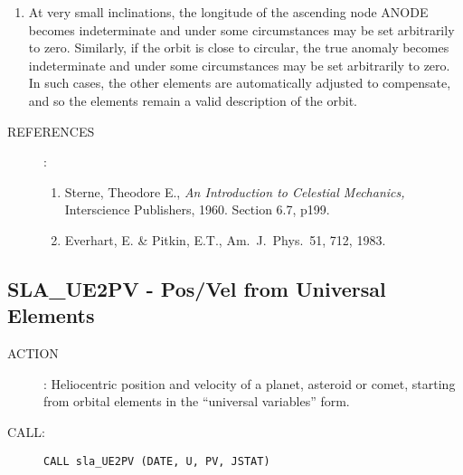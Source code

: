 \documentclass[11pt,twoside]{article}
\newcommand{\xlabel}[1]{}
\newcommand{\routine}[3]
{\hbadness=10000
  \vbox
  {
    \rule{\textwidth}{0.3mm}\\
    {\Large {\bf #1} \hfill #2 \hfill {\bf #1}}\\
    \setlength{\oldspacing}{\topsep}
    \setlength{\topsep}{0.3ex}
    \begin{description}
      #3
    \end{description}
    \setlength{\topsep}{\oldspacing}
  }
}
\renewcommand{\routine}[3]
   {
      \subsection{#1\xlabel{#1} - #2\label{#1}}
       \begin{description}
         #3
       \end{description}
   }
\newcommand{\action}[1]
{\item[ACTION]: #1}
\newcommand{\action}[1]
   {\item[ACTION:] #1}
\newcommand{\call}[1]
{\item[CALL]: \hspace{0.4em}{\tt #1}}
\newlength{\oldspacing}
\renewcommand{\call}[1]
   {
    \item[CALL:] {\tt #1}
   }
\newcommand{\refs}[1]
{
  \goodbreak
  \setlength{\oldspacing}{\topsep}
  \setlength{\topsep}{0.3ex}
  \begin{description}
    \item[REFERENCES]:
        #1
  \end{description}
  \setlength{\topsep}{\oldspacing}
}
\newcommand{\refs}[1]
   {
     \begin{description}
       \item[REFERENCES:]
           #1
     \end{description}
   }
\begin{document}
{\begin{enumerate}
        where:
        \begin{tabbing}
        xxx \= xxxxxxxx \= xxx \= \kill
        \> $t_0$    \> is the epoch of the elements (MJD, TT) \\
        \> $T$      \> is the epoch of perihelion (MJD, TT) \\
        \> $i$      \> is the inclination (radians) \\
        \> $\Omega$ \> is the longitude of the ascending node (radians) \\
        \> $\varpi$ \> is the longitude of perihelion (radians) \\
        \> $\omega$ \> is the argument of perihelion (radians) \\
        \> $a$      \> is the mean distance (AU) \\
        \> $q$      \> is the perihelion distance (AU) \\
        \> $e$      \> is the eccentricity \\
        \> $L$      \> is the longitude (radians, $0-2\pi$) \\
        \> $M$      \> is the mean anomaly (radians, $0-2\pi$) \\
        \> $n$      \> is the daily motion (radians) \\
        \> - \> means no value is set
        \end{tabbing}
  \item At very small inclinations, the longitude of the ascending node
        ANODE becomes indeterminate and under some circumstances may be
        set arbitrarily to zero.  Similarly, if the orbit is close to
        circular, the true anomaly becomes indeterminate and under some
        circumstances may be set arbitrarily to zero.  In such cases,
        the other elements are automatically adjusted to compensate,
        and so the elements remain a valid description of the orbit.
 \end{enumerate}
}
\refs{
   \begin{enumerate}
   \item Sterne, Theodore E., {\it An Introduction to Celestial Mechanics,}\/
         Interscience Publishers, 1960.  Section 6.7, p199.
   \item Everhart, E. \& Pitkin, E.T., Am.~J.~Phys.~51, 712, 1983.
   \end{enumerate}
}
\routine{SLA\_UE2PV}{Pos/Vel from Universal Elements}
{
 \action{Heliocentric position and velocity of a planet, asteroid or comet,
         starting from orbital elements in the ``universal variables'' form.}
 \call{CALL sla\_UE2PV (DATE, U, PV, JSTAT)}
}
\end{document}
